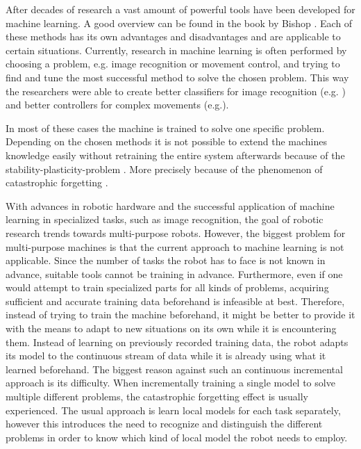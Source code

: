 After decades of research a vast amount of powerful tools have been developed for machine learning. A good overview can be found in the book by Bishop \cite{bishop}. Each of these methods has its own advantages and disadvantages and are applicable to certain situations. Currently, research in machine learning is often performed by choosing a problem, e.g. image recognition or movement control, and trying to find and tune the most successful method to solve the chosen problem. This way the researchers were able to create better classifiers for image recognition (e.g. \cite{imageRecList}) and better controllers for complex movements (e.g.\cite{movementList}).


In most of these cases the machine is trained to solve one specific problem. Depending on the chosen methods it is not possible to extend the machines knowledge easily without retraining the entire system afterwards because of the stability-plasticity-problem \cite{stability-plasticity}. More precisely because of the phenomenon of catastrophic forgetting \cite{catastrophicForgetting1}.

With advances in robotic hardware and the successful application of machine learning in specialized tasks, such as image recognition, the goal of robotic research trends towards multi-purpose robots. However, the biggest problem for multi-purpose machines is that the current approach to machine learning is not applicable. Since the number of tasks the robot has to face is not known in advance, suitable tools cannot be training in advance. Furthermore, even if one would attempt to train specialized parts for all kinds of problems, acquiring sufficient and accurate training data beforehand is infeasible at best. 
Therefore, instead of trying to train the machine beforehand, it might be better to provide it with the means to adapt to new situations on its own while it is encountering them. Instead of learning on previously recorded training data, the robot adapts its model to the continuous stream of data while it is already using what it learned beforehand. The biggest reason against such an continuous incremental approach is its difficulty. When incrementally training a single model to solve multiple different problems, the catastrophic forgetting effect is usually experienced. The usual approach is learn local models for each task separately, however this introduces the need to recognize and distinguish the different problems in order to know which kind of local model the robot needs to employ. 

